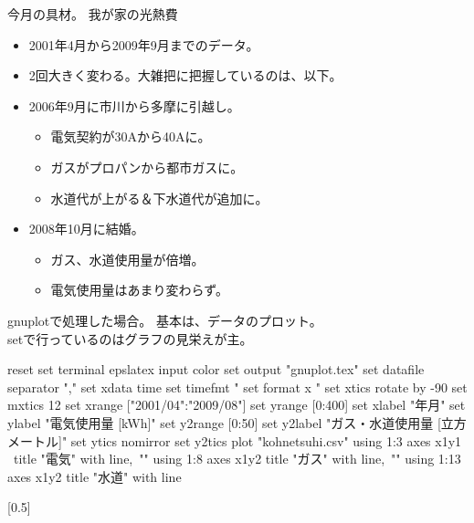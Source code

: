 \begin{frame}{今月の具材。}
我が家の光熱費
\begin{itemize}
 \item 2001年4月から2009年9月までのデータ。
 \item 2回大きく変わる。大雑把に把握しているのは、以下。
 \item 2006年9月に市川から多摩に引越し。
       \begin{itemize}
	\item 電気契約が30Aから40Aに。
	\item ガスがプロパンから都市ガスに。
	\item 水道代が上がる＆下水道代が追加に。
       \end{itemize}
 \item 2008年10月に結婚。
       \begin{itemize}
	\item ガス、水道使用量が倍増。
	\item 電気使用量はあまり変わらず。
       \end{itemize}
\end{itemize}
\end{frame}


\begin{frame}[containsverbatim]{gnuplotで処理した場合。}
基本は、データのプロット。\\
setで行っているのはグラフの見栄えが主。

 \begin{minipage}{0.45\hsize}
 \begin{commandline0}
reset
set terminal epslatex input color
set output "gnuplot.tex"
set datafile separator ","
set xdata time
set timefmt "%
set format x "%
set xtics rotate by -90
set mxtics 12
set xrange ["2001/04":"2009/08"]
set yrange [0:400]
set xlabel "年月"
set ylabel "電気使用量 [kWh]"
set y2range [0:50]
set y2label "ガス・水道使用量 [立方メートル]"
set ytics nomirror
set y2tics
plot "kohnetsuhi.csv" using 1:3 axes x1y1 \
  title "電気" with line,\
  "" using 1:8 axes x1y2 title "ガス" with line,\
  "" using 1:13 axes x1y2 title "水道" with line
 \end{commandline0}
 \end{minipage}
 \begin{minipage}{0.45\hsize}
  \scalebox{0.5}[0.5]{}
 \end{minipage}
\end{frame}

